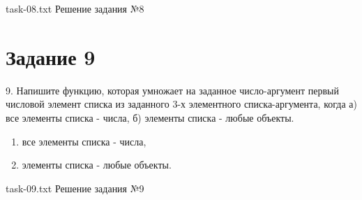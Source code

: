 {task-08.txt} %
{Решение задания №8} %

\section{Задание 9}

9. Напишите функцию, которая умножает на заданное число-аргумент первый числовой элемент списка из заданного 3-х элементного списка-аргумента, когда а) все элементы списка - числа, б) элементы списка - любые объекты.

\begin{enumerate}[label={\alph*)}]
	\item все элементы списка - числа,
	\item элементы списка - любые объекты.
\end{enumerate}

{task-09.txt} %
{Решение задания №9} %